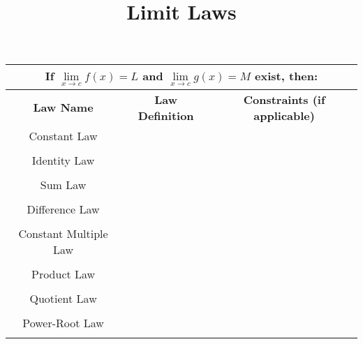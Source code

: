 \documentclass{siproblemset}
\title{Limit Laws}
\begin{document}
    \maketitle
    
    
    \begin{center}
        \begin{tabular}{ |c|c|c| } 
            \hline
            \multicolumn{3}{|c|}{If $\lim\limits_{x\to c}f(x)=L$ and $\lim\limits_{x\to c}g(x)=M$ exist, then:}\\[4ex]
            \hline
            \textbf{Law Name} & \textbf{Law Definition} & \textbf{Constraints (if applicable)} \\ 
            \hline
            Constant Law & \hspace{3in} & \\ 
            &&\\
            \hline
            Identity Law & \hspace{3in} & \\ 
            &&\\
            \hline
            Sum Law & \hspace{3in} & \\ 
            &&\\
            \hline
            Difference Law & \hspace{3in} & \\ 
            &&\\
            \hline
            Constant Multiple Law & \hspace{3in} & \\ 
            &&\\
            \hline
            Product Law & \hspace{3in} & \\ 
            &&\\
            \hline
            Quotient Law & \hspace{3in} & \\ 
            &&\\
            \hline
            Power-Root Law & \hspace{3in} & \\ 
            &&\\
            \hline
        \end{tabular}
    \end{center}
\end{document}
